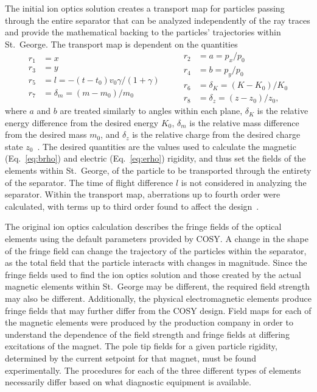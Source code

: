 The initial ion optics solution creates a transport map for particles
passing through the entire separator that can be analyzed independently
of the ray traces and provide the mathematical backing to the particles'
trajectories within St.\ George. The transport map is dependent on the
quantities
\begin{equation}
    \label{eq:cosyvars}
    \begin{split}
        r_1 &= x \\
        r_3 &= y \\
        r_5 &= l = -(t - t_0)v_0\gamma/(1 + \gamma) \\
        r_7 &= \delta_m = (m - m_0)/m_0
    \end{split}
    \quad\quad
    \begin{split}
        r_2 &= a = p_x/p_0 \\
        r_4 &= b = p_y/p_0 \\
        r_6 &= \delta_K = (K - K_0)/K_0\\
        r_8 &= \delta_z = (z - z_0)/z_0,
    \end{split}
\end{equation}
where $a$ and $b$ are treated similarly to angles within each plane,
$\delta_K$ is the relative energy difference from the desired energy
$K_0$, $\delta_m$ is the relative mass difference from the desired mass
$m_0$, and $\delta_z$ is the relative charge from the desired charge
state $z_0$~\cite{COSY}. The desired quantities are the values used to
calculate the magnetic (Eq.~\ref{eq:brho}) and electric
(Eq.~\ref{eq:erho}) rigidity, and thus set the fields of the elements
within St.\ George, of the particle to be transported through the
entirety of the separator. The time of flight difference $l$ is not
considered in analyzing the separator. Within the transport map,
aberrations up to fourth order were calculated, with terms up to third
order found to affect the design~\cite{Couder2008}.

The original ion optics calculation describes the fringe fields of the
optical elements using the default parameters provided by COSY. A change
in the shape of the fringe field can change the trajectory of the
particles within the separator, as the total field that the particle
interacts with changes in magnitude. Since the fringe fields used to
find the ion optics solution and those created by the actual magnetic
elements within St.\ George may be different, the required field
strength may also be different. Additionally, the physical
electromagnetic elements produce fringe fields that may further differ
from the COSY design. Field maps for each of the magnetic elements were
produced by the production company in order to understand the dependence
of the field strength and fringe fields at differing excitations of the
magnet. The pole tip fields for a given particle rigidity, determined by
the current setpoint for that magnet, must be found experimentally. The
procedures for each of the three different types of elements necessarily
differ based on what diagnostic equipment is available.

